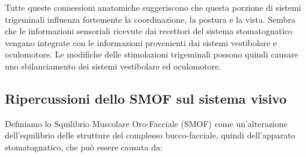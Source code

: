 Tutte queste connessioni anatomiche suggeriscono che questa porzione di sistemi trigeminali influenza fortemente la coordinazione, la postura e la vista. Sembra che le informazioni sensoriali ricevute dai recettori del sistema stomatognatico vengano integrate con le informazioni  provenienti dai sistemi vestibolare e oculomotore. Le modifiche delle stimolazioni trigeminali possono quindi causare uno sbilanciamento dei sistemi vestibolare ed oculomotore.


\subsection{Ripercussioni dello SMOF sul sistema visivo}
 
Definiamo lo Squilibrio Muscolare Oro-Facciale (SMOF) come un’alterazione dell’equilibrio delle strutture del complesso bucco-facciale, quindi dell’apparato stomatognatico, che può essere causata da:


